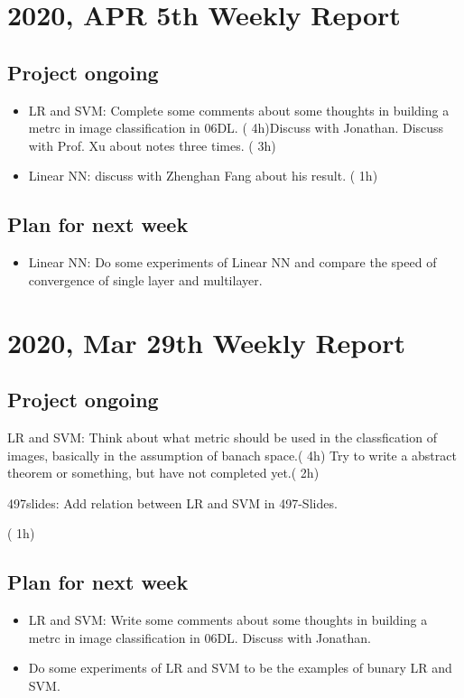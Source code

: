 \documentclass[10pt]{amsart}
\begin{document}
\section{2020, APR 5th Weekly Report }
\subsection{Project ongoing}
\begin{itemize}
\item {\color{red} LR and SVM: Complete some comments about some thoughts in building a metrc in image classification in 06DL.} ({\color{blue} 4h})Discuss with Jonathan. Discuss with Prof. Xu about notes three times. ({\color{blue} 3h})
\item Linear NN: discuss with Zhenghan Fang about his result. ({\color{blue} 1h})
\end{itemize}
\subsection{Plan for next week}
\begin{itemize}
	\item Linear NN: Do some experiments of Linear NN and compare the speed of convergence of single layer and multilayer.
	
\end{itemize}

\section{2020, Mar 29th Weekly Report }
\subsection{Project ongoing}
\begin{itemize}
	\item LR and SVM: Think about what metric should be used in the classfication of images, basically in the assumption of banach space.({\color{blue} 4h}) Try to write a abstract theorem or something, but have not completed yet.({\color{blue} 2h})
	{\color{red} \item 497slides: Add relation between LR and SVM in 497-Slides.}({\color{blue} 1h})
\end{itemize}
\subsection{Plan for next week}
\begin{itemize}
	\item LR and SVM: Write some comments about some thoughts in building a metrc in image classification in 06DL. Discuss with Jonathan.
	\item Do some experiments of LR and SVM to be the examples of bunary LR and SVM.
	
\end{itemize}
\end{document}
